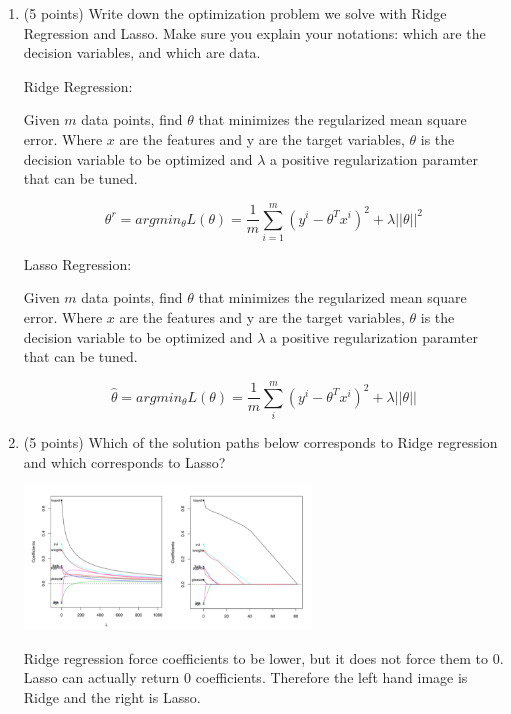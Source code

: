 \documentclass[a4paper,12pt,fleqn]{article}
\begin{document}
\begin{enumerate}
\item (5 points) Write down the optimization problem we solve with Ridge Regression and Lasso. Make sure you explain your notations: which are the decision variables, and which are data. 

\vspace{.15in}
Ridge Regression:

Given $m$ data points, find $\theta$ that minimizes the regularized mean square error.  Where $x$ are the features and y are the target variables, $\theta$ is the decision variable to be optimized and $\lambda$ a positive regularization paramter that can be tuned.

$$
\theta^r = argmin_{\theta}L(\theta) = \frac{1}{m}\sum_{i=1}^{m} (y^i -\theta^Tx^i)^2+\lambda||\theta||^2
$$



\vspace{.15in}
Lasso Regression:

Given $m$ data points, find $\theta$ that minimizes the regularized mean square error.  Where $x$ are the features and y are the target variables, $\theta$ is the decision variable to be optimized and $\lambda$ a positive regularization paramter that can be tuned.


$$
\hat{\theta} = argmin_{\theta}L(\theta) = \frac{1}{m}\sum_{i}^{m} (y^i -\theta^Tx^i)^2+\lambda||\theta||
$$

\vspace{.15in}

\item (5 points) Which of the solution paths below corresponds to Ridge regression and which corresponds to Lasso?
%
\begin{center}
\includegraphics[width = 0.6\textwidth]{path}
\end{center}

\vspace{0.15in}
Ridge regression force coefficients to be lower, but it does not force them to 0.  Lasso can actually return 0 coefficients.  Therefore the left hand image is Ridge and the right is Lasso.


\end{enumerate}
\end{document}
